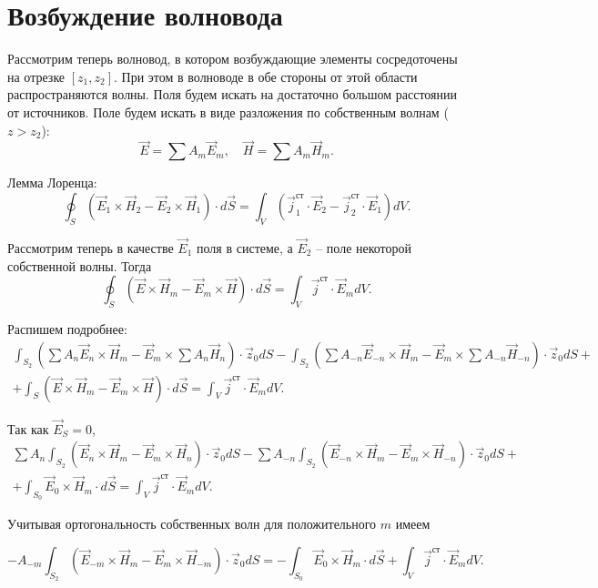 \section{Возбуждение волновода}
Рассмотрим теперь волновод, в котором возбуждающие элементы сосредоточены на отрезке \([z_1, z_2]\). При этом в волноводе в обе стороны от этой области распространяются волны. Поля будем искать на достаточно большом расстоянии от источников. Поле будем искать в виде разложения по собственным волнам (\( z > z_2 \)):
\[
	\vec{E} = \sum A_m\vec{E}_m,\quad \vec{H} = \sum A_m\vec{H}_m.
\]

Лемма Лоренца:
\[
  \oint_S\left( \vec{E}_1\times\vec{H}_2 - \vec{E}_2\times\vec{H}_1 \right)\cdot d\vec{S} = \int_V \left(
  \vec{j}_1^\text{ст}\cdot\vec{E}_2 - \vec{j}_2^\text{ст}\cdot\vec{E}_1\right) dV.
\]

Рассмотрим теперь в качестве \( \vec{E}_1 \) поля в системе, а \( \vec{E}_2 \) -- поле некоторой собственной волны. Тогда
\[
  \oint_S\left( \vec{E}\times\vec{H}_m - \vec{E}_m\times\vec{H} \right)\cdot d\vec{S} = \int_V \vec{j}^\text{ст}\cdot\vec{E}_m dV.
\]

Распишем подробнее:
\begin{gather*}
  \int_{S_2}\left( \sum A_n\vec{E}_n\times\vec{H}_m - \vec{E}_m\times\sum A_n\vec{H}_n \right)\cdot\vec{z}_0 dS
  -\int_{S_2}\left( \sum A_{-n}\vec{E}_{-n}\times\vec{H}_m - \vec{E}_m\times\sum A_{-n}\vec{H}_{-n} \right)\cdot\vec{z}_0 dS +\\+
  \int_S\left( \vec{E}\times\vec{H}_m - \vec{E}_m\times\vec{H} \right)\cdot d\vec{S} = \int_V \vec{j}^\text{ст}\cdot\vec{E}_m dV.
\end{gather*}

Так как \( \vec{E}_S = 0 \),
\begin{gather*}
  \sum A_n\int_{S_2}\left(\vec{E}_n\times\vec{H}_m - \vec{E}_m\times\vec{H}_n \right)\cdot\vec{z}_0 dS
  -\sum A_{-n}\int_{S_2}\left( \vec{E}_{-n}\times\vec{H}_m - \vec{E}_m\times\vec{H}_{-n} \right)\cdot\vec{z}_0 dS +\\+
  \int_{S_0} \vec{E}_0\times\vec{H}_m \cdot d\vec{S} = \int_V \vec{j}^\text{ст}\cdot\vec{E}_m dV.
\end{gather*}

Учитывая ортогональность собственных волн для положительного \( m \) имеем

\[
  -A_{-m}\int_{S_2}\left( \vec{E}_{-m}\times\vec{H}_m - \vec{E}_m\times\vec{H}_{-m} \right)\cdot\vec{z}_0 dS =
  -\int_{S_0} \vec{E}_0\times\vec{H}_m \cdot d\vec{S} + \int_V \vec{j}^\text{ст}\cdot\vec{E}_m dV.
\]


